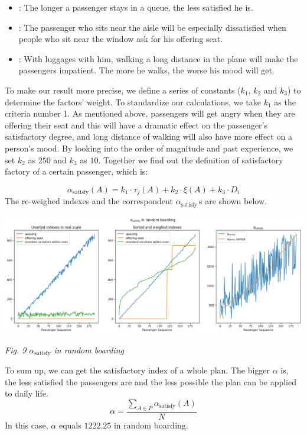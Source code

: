 \documentclass{article}
\theoremstyle{definition}
\theoremstyle{remark}
\numberwithin{equation}{section}
\begin{document}
	\begin{itemize}
		\item {}: The longer a passenger stays in a queue, the less satisfied he is.
		\item {}: The passenger who sits near the aisle will be especially dissatisfied when people who sit near the window ask for his offering seat.
		\item {}: With luggages with him, walking a long distance in the plane will make the passengers impatient. The more he walks, the worse his mood will get.
	\end{itemize}
	To make our result more precise, we define a series of constants ($k_1$, $k_2$ and $k_3$) to determine the factors' weight. To standardize our calculations, we take $k_1$ as the criteria number 1. As mentioned above, passengers will get angry when they are offering their seat and this will have a dramatic effect on the passenger's satisfactory degree, and long distance of walking will also have more effect on a person's mood. By looking into the order of magnitude and past experience, we set \(k_2\) as \(250\) and \(k_3\) as \(10\).
	Together we find out the definition of satisfactory factory of a certain passenger, which is:

	$$\alpha_\text{satisfy}(A)=k_1\cdot \tau_j(A)+k_2\cdot\xi\left(A\right)+k_3\cdot D_i$$
	The re-weighed indexes and the correspondent \(\alpha_{\mathrm{satisfy}}\,\)s are shown below.
	\begin{center}
		\includegraphics[width = 17cm]{random satis.png}

		\small\textit{Fig. 9 \(\alpha_{\mathrm{satisfy}}\) in random boarding}
	\end{center}
	To sum up, we can get the satisfactory index of a whole plan. The bigger $\alpha$ is, the less satisfied the passengers are and the less possible the plan can be applied to daily life.
	$$\alpha=\dfrac{\sum\limits_{A\in P} \alpha_\text{satisfy}(A)}{N}$$
	In this case, \(\alpha\) equals \(1222.25\) in random boarding.
\end{document}
